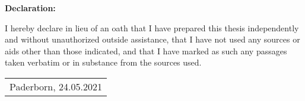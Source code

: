 \thispagestyle{empty}    %
\sffamily
\vspace*{16cm}
\textbf{Declaration:}
\parskip 12pt

I hereby declare in lieu of an oath that I have prepared this thesis independently and without unauthorized outside assistance, that I have not used any sources or aids other than those indicated, and that I have marked as such any passages taken verbatim or in substance from the sources used.
\vspace*{2.4cm}

		\begin{tabular}{l}
		  \cline{1-1}
		  \begin{minipage}[t]{0.5\textwidth}
		    
		    Paderborn, 24.05.2021
			\end{minipage}
		\end{tabular}
\cleardoublepage